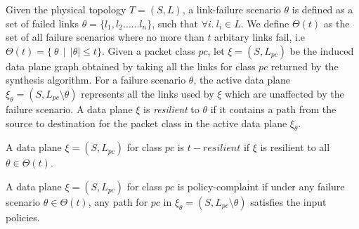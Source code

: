 Given the physical topology $T=(S,L)$, a link-failure
scenario $\theta$ is defined as a set of failed links $\theta = \{l_1, l_2 \ldots ... l_n\}$,
such that $\forall i.\ l_i \in L$.
	We define $\Theta(t)$ as the set of all failure scenarios where no more than $t$
	arbitary links fail, i.e $\Theta(t) = \{ \ \theta \ \ | \ \ |\theta| \leq t\}$.
Given a packet class $pc$,
let $\xi = (S, L_{pc})$ be the induced data plane graph obtained
by taking all the links for class $pc$ returned by the synthesis algorithm. For a failure scenario
$\theta$, the active data plane $\xi_\theta = (S, L_{pc} \setminus \theta)$ represents
all the links used by $\xi$ which are unaffected by the failure scenario. A data
plane $\xi$ is {\em resilient} to $\theta$ if it contains a path from the source to 
destination for the packet class in the active data plane $\xi_\theta$.
\begin{mydef}[Resilience]
	A data plane $\xi = (S, L_{pc})$ for class $pc$ is $t-resilient$ if $\xi$ is 
	resilient to all $\theta \in \Theta(t)$.
\end{mydef}
\begin{mydef}
	A data plane $\xi = (S, L_{pc})$ for class $pc$ is policy-complaint if under
	any failure scenario $\theta \in \Theta(t)$, any path for $pc$ in 
	$\xi_\theta=(S, L_{pc} \setminus \theta)$ satisfies the input policies. 
\end{mydef}
